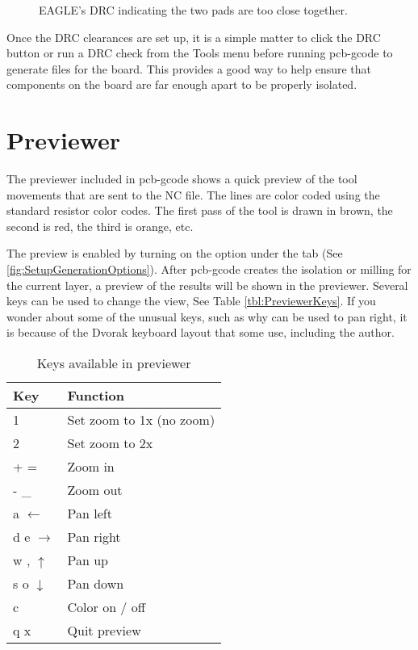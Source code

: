 \documentclass[11pt]{book}
\begin{document}
\begin{figure}
	\caption{EAGLE's DRC indicating the two pads are too close together.}
	\label{fig:DRCError}
\end{figure}

Once the DRC clearances are set up, it is a simple matter to click the DRC button or run a DRC check from the Tools menu before running pcb-gcode to generate files for the board. This provides a good way to help ensure that components on the board are far enough apart to be properly isolated.

%
%
\section{Previewer}\label{sec:Previewer}

The previewer included in pcb-gcode shows a quick preview of the tool movements that are sent to the NC file. The lines are color coded using the standard resistor color codes. The first pass of the tool is drawn in brown, the second is red, the third is orange, etc.

The preview is enabled by turning on the  option under the  tab (See \figurename \vref{fig:SetupGenerationOptions}). After pcb-gcode creates the isolation or milling for the current layer, a preview of the results will be shown in the previewer. Several keys can be used to change the view, See Table \vref{tbl:PreviewerKeys}. If you wonder about some of the unusual keys, such as why  can be used to pan right, it is because of the Dvorak keyboard layout that some use, including the author.

\begin{table}[h]\caption{Keys available in previewer}\label{tbl:PreviewerKeys}
\centering
\begin{tabular}{ll}
	\toprule
	Key 		& Function\\ 
	\midrule
	1		& Set zoom to 1x (no zoom)\\
	2		& Set zoom to 2x\\
	+ =		& Zoom in\\
	- \_{}		& Zoom out\\
	a $\leftarrow$ & Pan left\\
	d e $\rightarrow$ & Pan right\\
	w , $\uparrow$ & Pan up\\
	s o $\downarrow$ & Pan down\\
	c		& Color on / off\\
	q x		& Quit preview \\ \bottomrule
\end{tabular}
\end{table}
\end{document}
